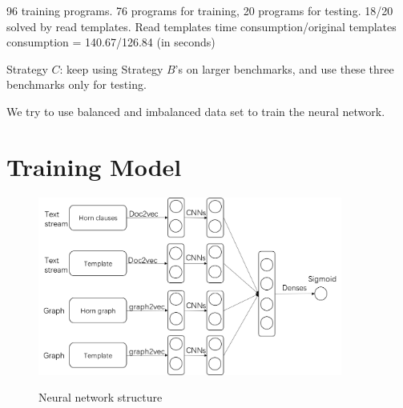 \documentclass{article}
\begin{document}
96 training programs. 76 programs for training, 20 programs for testing.
18/20 solved by read templates. Read templates time consumption/original templates consumption =  140.67/126.84 (in seconds)

Strategy $C$: keep using Strategy $B$'s on larger benchmarks, and use these three benchmarks only for testing.






We try to use balanced and imbalanced data set to train the neural network.




\section{Training Model}


\begin{figure}[h]
\centering
  \includegraphics[width=10cm]{graph/NNstructure}\\
  \caption{Neural network structure}\label{NNstructure}
\end{figure}
\end{document}
